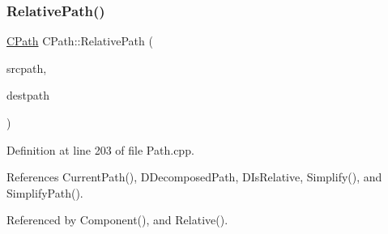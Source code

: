 \subsubsection{\texorpdfstring{Relative\+Path()}{RelativePath()}}
{\footnotesize\ttfamily \hyperlink{classCPath}{C\+Path} C\+Path\+::\+Relative\+Path (\begin{DoxyParamCaption}\item[{const \hyperlink{classCPath}{C\+Path} \&}]{srcpath,  }\item[{const \hyperlink{classCPath}{C\+Path} \&}]{destpath }\end{DoxyParamCaption})\hspace{0.3cm}{\ttfamily [static]}}



Definition at line 203 of file Path.\+cpp.



References Current\+Path(), D\+Decomposed\+Path, D\+Is\+Relative, Simplify(), and Simplify\+Path().



Referenced by Component(), and Relative().


